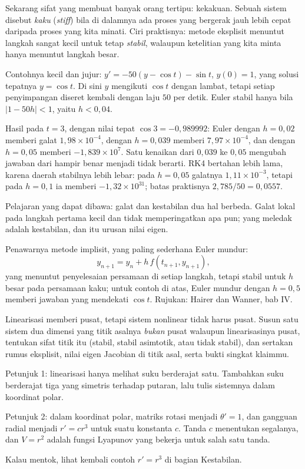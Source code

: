 Sekarang sifat yang membuat banyak orang tertipu: kekakuan. Sebuah sistem
disebut \emph{kaku} (\emph{stiff}) bila di dalamnya ada proses yang bergerak
jauh lebih cepat daripada proses yang kita minati. Ciri praktisnya: metode
eksplisit menuntut langkah sangat kecil untuk tetap \emph{stabil}, walaupun
ketelitian yang kita minta hanya menuntut langkah besar.

Contohnya kecil dan jujur: $y'=-50(y-\cos t)-\sin t$, $y(0)=1$, yang solusi
tepatnya $y=\cos t$. Di sini $y$ mengikuti $\cos t$ dengan lambat, tetapi setiap
penyimpangan diseret kembali dengan laju $50$ per detik. Euler stabil hanya bila
$|1-50h|<1$, yaitu $h<0{,}04$.

Hasil pada $t=3$, dengan nilai tepat $\cos3=-0{,}989992$: Euler dengan $h=0{,}02$
memberi galat $1{,}98\times10^{-4}$, dengan $h=0{,}039$ memberi
$7{,}97\times10^{-4}$, dan dengan $h=0{,}05$ memberi $-1{,}839\times10^{7}$. Satu
kenaikan dari $0{,}039$ ke $0{,}05$ mengubah jawaban dari hampir benar menjadi tidak
berarti. RK4 bertahan lebih lama, karena daerah stabilnya lebih lebar: pada
$h=0{,}05$ galatnya $1{,}11\times10^{-3}$, tetapi pada $h=0{,}1$ ia memberi
$-1{,}32\times10^{31}$; batas praktisnya $2{,}785/50=0{,}0557$.

Pelajaran yang dapat dibawa: galat dan kestabilan dua hal berbeda. Galat lokal
pada langkah pertama kecil dan tidak memperingatkan apa pun; yang meledak adalah
kestabilan, dan itu urusan nilai eigen.

Penawarnya metode implisit, yang paling sederhana Euler mundur:
\[
y_{n+1}=y_{n}+h\,f(t_{n+1},y_{n+1}),
\]
yang menuntut penyelesaian persamaan di setiap langkah, tetapi stabil untuk $h$
besar pada persamaan kaku; untuk contoh di atas, Euler mundur dengan $h=0{,}5$
memberi jawaban yang mendekati $\cos t$. Rujukan: Hairer dan Wanner, bab IV.

\begin{tantangan}
Linearisasi memberi pusat, tetapi sistem nonlinear tidak harus pusat. Susun satu
sistem dua dimensi yang titik asalnya \emph{bukan} pusat walaupun linearisasinya
pusat, tentukan sifat titik itu (stabil, stabil asimtotik, atau tidak stabil),
dan sertakan rumus eksplisit, nilai eigen Jacobian di titik asal, serta bukti
singkat klaimmu.

Petunjuk 1: linearisasi hanya melihat suku berderajat satu. Tambahkan suku
berderajat tiga yang simetris terhadap putaran, lalu tulis sistemnya dalam
koordinat polar.

Petunjuk 2: dalam koordinat polar, matriks rotasi menjadi $\theta'=1$, dan
gangguan radial menjadi $r'=cr^{3}$ untuk suatu konstanta $c$. Tanda $c$
menentukan segalanya, dan $V=r^{2}$ adalah fungsi Lyapunov yang bekerja untuk
salah satu tanda.

Kalau mentok, lihat kembali contoh $r'=r^{3}$ di bagian Kestabilan.
\end{tantangan}
